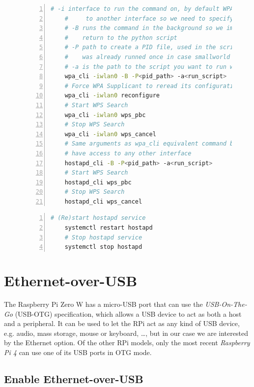 \documentclass[a4paper,11pt,oneside]{report}
\begin{document}
\begin{figure}
\begin{lstlisting}[language=bash, label=cmd:cli, caption=WPA Supplicant and hostapd clients commands,numbers=left]
    # -i interface to run the command on, by default WPA Supplicant as access
    #     to another interface so we need to specify it for wpa_cli commands
    # -B runs the command in the background so we immediately
    #    return to the python script
    # -P path to create a PID file, used in the script to check if the command
    #    was already runned once in case smallworld restart after a crash
    # -a is the path to the script you want to run when there is an event
    wpa_cli -iwlan0 -B -P<pid_path> -a<run_script>
    # Force WPA Supplicant to reread its configuration file
    wpa_cli -iwlan0 reconfigure
    # Start WPS Search
    wpa_cli -iwlan0 wps_pbc
    # Stop WPS Search
    wpa_cli -iwlan0 wps_cancel
    # Same arguments as wpa_cli equivalent command but hostapd does not
    # have access to any other interface
    hostapd_cli -B -P<pid_path> -a<run_script>
    # Start WPS Search
    hostapd_cli wps_pbc
    # Stop WPS Search
    hostapd_cli wps_cancel
\end{lstlisting}
\end{figure}

\begin{figure}
\begin{lstlisting}[language=bash, label=cmd:systemd, caption=System commands to start and stop hostapd,numbers=left]
    # (Re)start hostapd service
    systemctl restart hostapd
    # Stop hostapd service
    systemctl stop hostapd
\end{lstlisting}
\end{figure}

\section{Ethernet-over-USB}

The Raspberry Pi Zero W has a micro-USB port that can use the \emph{USB-On-The-Go} (USB-OTG) specification, which allows a USB device to act as both a host and a peripheral. It can be used to let the RPi act as any kind of USB device, e.g. audio, mass storage, mouse or keyboard, \ldots, but in our case we are interested by the Ethernet option. Of the other RPi models, only the most recent \emph{Raspberry Pi 4} can use one of its USB ports in OTG mode.

\subsection{Enable Ethernet-over-USB}
\end{document}
